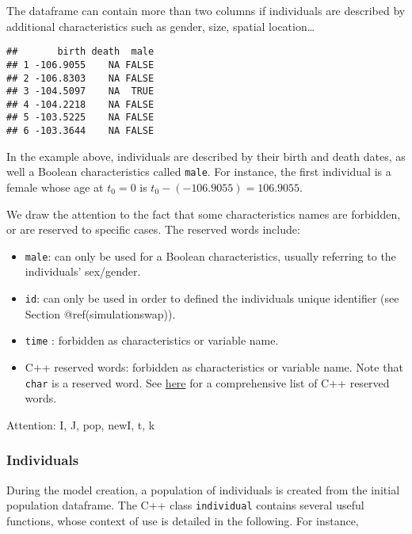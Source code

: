 The dataframe can contain more than two columns if individuals are described by additional characteristics such as gender, size, spatial location\ldots{}

\begin{Shaded}
\begin{Highlighting}[]
\end{Highlighting}
\end{Shaded}

\begin{verbatim}
##       birth death  male
## 1 -106.9055    NA FALSE
## 2 -106.8303    NA FALSE
## 3 -104.5097    NA  TRUE
## 4 -104.2218    NA FALSE
## 5 -103.5225    NA FALSE
## 6 -103.3644    NA FALSE
\end{verbatim}

In the example above, individuals are described by their birth and death dates, as well a Boolean characteristics called \texttt{male}. For instance, the first individual is a female whose age at \(t_0=0\) is \(t_0 - (-106.9055) = 106.9055\).

We draw the attention to the fact that some characteristics names are forbidden, or are reserved to specific cases. The reserved words include:

\begin{itemize}
\tightlist
\item
  \texttt{male}: can only be used for a Boolean characteristics, usually referring to the individuals' sex/gender.
\item
  \texttt{id}: can only be used in order to defined the individuals unique identifier (see Section @ref(simulationswap)).
\item
  \texttt{time} : forbidden as characteristics or variable name.\\
\item
  C++ reserved words: forbidden as characteristics or variable name. Note that \texttt{char}
  is a reserved word. See \href{https://en.cppreference.com/w/cpp/keyword}{here} for a comprehensive list of C++ reserved words.
\end{itemize}

Attention: I, J, pop, newI, t, k

\hypertarget{individuals}{%
\subsubsection{Individuals}\label{individuals}}

During the model creation, a population of individuals is created from the initial population dataframe. The C++ class \texttt{individual} contains several useful functions, whose context of use is detailed in the following. For instance,


